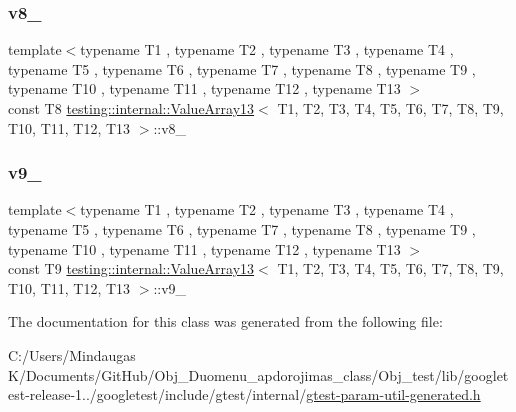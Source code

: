 \mbox{\label{classtesting_1_1internal_1_1_value_array13_a9d20e7e2e3010fa05f01d5f8f6367b87}} 
\subsubsection{\texorpdfstring{v8\_}{v8\_}}
{\footnotesize\ttfamily template$<$typename T1 , typename T2 , typename T3 , typename T4 , typename T5 , typename T6 , typename T7 , typename T8 , typename T9 , typename T10 , typename T11 , typename T12 , typename T13 $>$ \\
const T8 \mbox{\hyperlink{classtesting_1_1internal_1_1_value_array13}{testing\+::internal\+::\+Value\+Array13}}$<$ T1, T2, T3, T4, T5, T6, T7, T8, T9, T10, T11, T12, T13 $>$\+::v8\+\_\+\hspace{0.3cm}{\ttfamily [private]}}

\mbox{\label{classtesting_1_1internal_1_1_value_array13_a38cf3ad4d73e7a5ea38618943df0c4fb}} 
\subsubsection{\texorpdfstring{v9\_}{v9\_}}
{\footnotesize\ttfamily template$<$typename T1 , typename T2 , typename T3 , typename T4 , typename T5 , typename T6 , typename T7 , typename T8 , typename T9 , typename T10 , typename T11 , typename T12 , typename T13 $>$ \\
const T9 \mbox{\hyperlink{classtesting_1_1internal_1_1_value_array13}{testing\+::internal\+::\+Value\+Array13}}$<$ T1, T2, T3, T4, T5, T6, T7, T8, T9, T10, T11, T12, T13 $>$\+::v9\+\_\+\hspace{0.3cm}{\ttfamily [private]}}



The documentation for this class was generated from the following file\+:\begin{DoxyCompactItemize}
\item 
C\+:/\+Users/\+Mindaugas K/\+Documents/\+Git\+Hub/\+Obj\+\_\+\+Duomenu\+\_\+apdorojimas\+\_\+class/\+Obj\+\_\+test/lib/googletest-\/release-\/1../googletest/include/gtest/internal/\mbox{\hyperlink{gtest-param-util-generated_8h}{gtest-\/param-\/util-\/generated.\+h}}\end{DoxyCompactItemize}
